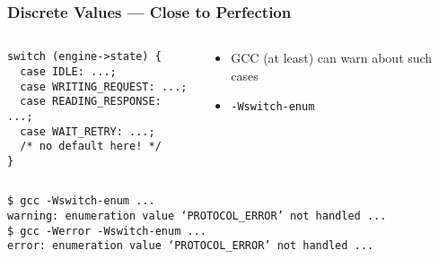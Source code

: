 \begin{frame}[fragile]
  \frametitle{Discrete Values --- Close to Perfection}

  \begin{columns}[t]

    \begin{column}{.5\textwidth}

      \begin{block}{}
\begin{verbatim}
switch (engine->state) {
  case IDLE: ...;
  case WRITING_REQUEST: ...;
  case READING_RESPONSE: ...;
  case WAIT_RETRY: ...;
  /* no default here! */
}
\end{verbatim}
      \end{block}

    \end{column}

    \begin{column}{.4\textwidth}
      
      \begin{itemize}
      \item GCC (at least) can warn about such cases
      \item \texttt{-Wswitch-enum}
      \end{itemize}
     
    \end{column}
  
  \end{columns}

  \begin{block}{}
\begin{verbatim}
$ gcc -Wswitch-enum ...
warning: enumeration value ‘PROTOCOL_ERROR’ not handled ...
$ gcc -Werror -Wswitch-enum ...
error: enumeration value ‘PROTOCOL_ERROR’ not handled ...
\end{verbatim}
  \end{block}

\end{frame}
